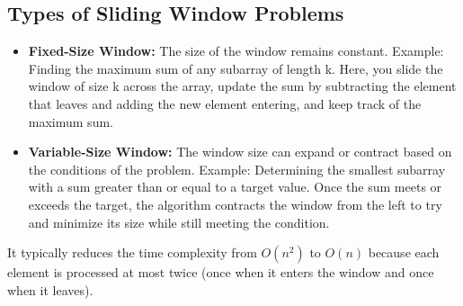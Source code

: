 \documentclass{report}
\begin{document}
   \subsection{Types of Sliding Window Problems}
   \bigbreak \noindent 
   \begin{itemize}
       \item \textbf{Fixed-Size Window:} The size of the window remains constant.
           \bigbreak \noindent 
           Example: Finding the maximum sum of any subarray of length k. Here, you slide the window of size k across the array, update the sum by subtracting the element that leaves and adding the new element entering, and keep track of the maximum sum.
        \item \textbf{Variable-Size Window:} The window size can expand or contract based on the conditions of the problem.
            \bigbreak \noindent 
            Example: Determining the smallest subarray with a sum greater than or equal to a target value. Once the sum meets or exceeds the target, the algorithm contracts the window from the left to try and minimize its size while still meeting the condition.
   \end{itemize}
   \bigbreak \noindent 
   It typically reduces the time complexity from $O(n^{2})$ to $O(n)$ because each element is processed at most twice (once when it enters the window and once when it leaves).

   \bigbreak \noindent 
\end{document}
